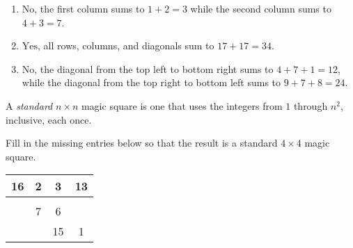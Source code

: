 \documentclass[11pt]{article}
\renewenvironment{problem}{\begin{problems}}{\end{problems}\vspace{5pt}}
\begin{document}
\begin{solution}
\begin{enumerate}[label=(\alph*)]
\item $\boxed{\text{No}}$, the first column sums to $1+2 = 3$ while the second column sums to $4+3 = 7$.

\item $\boxed{\text{Yes}}$, all rows, columns, and diagonals sum to $17+17=34$.

\item $\boxed{\text{No}}$, the diagonal from the top left to bottom right sums to $4+7+1=12$, while the diagonal from the
top right to bottom left sums to $9+7+8=24$.
\end{enumerate}
\end{solution}


\begin{definition}
A \textit{standard} $n \times n$ magic square is one that uses the integers from $1$ through $n^2$, inclusive, each once.
\end{definition}

\begin{problem}[4 points]
Fill in the missing entries below so that the result is a standard $4 \times 4$ magic square.

\begin{center}
\begin{tabular}{|c|c|c|c|}
\hline
16 & 2 & 3 & 13 \\ \hline
\phantom{5} & \phantom{11} & \phantom{10} & \phantom{8} \\ \hline
\phantom{9} & 7 & 6 & \phantom{12} \\ \hline
\phantom{4} & \phantom{14} & 15 & 1 \\ \hline
\end{tabular}
\end{center}
\end{problem}
\end{document}
